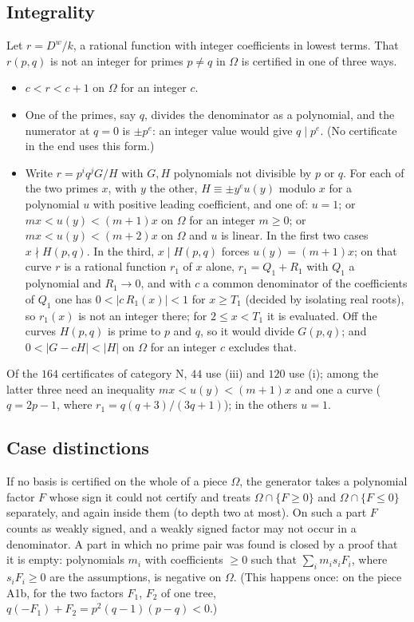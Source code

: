 \documentclass[11pt,a4paper]{amsart}
\theoremstyle{definition}
\theoremstyle{remark}
\newcommand{\Dw}{D^{w}}
\begin{document}
\subsection{Integrality}\label{ss:int} Let $r=\Dw/k$, a rational function with integer coefficients in lowest
terms. That $r(p,q)$ is not an integer for primes $p\ne q$ in $\Omega$ is certified in one of three ways.
\begin{itemize}
\item[(iii)] $c<r<c+1$ on $\Omega$ for an integer $c$.
\item[(ii)] One of the primes, say $q$, divides the denominator as a polynomial, and the numerator at $q=0$ is
$\pm p^e$: an integer value would give $q\mid p^e$. (No certificate in the end uses this form.)
\item[(i)] Write $r=p^iq^jG/H$ with $G,H$ polynomials not divisible by $p$ or $q$. For each of the two primes
$x$, with $y$ the other, $H\equiv\pm y^eu(y)$ modulo $x$ for a polynomial $u$ with positive leading
coefficient, and one of: $u=1$; or $mx<u(y)<(m+1)x$ on $\Omega$ for an integer $m\ge0$; or $mx<u(y)<(m+2)x$ on
$\Omega$ and $u$ is linear. In the first two cases $x\nmid H(p,q)$. In the third, $x\mid H(p,q)$ forces
$u(y)=(m+1)x$; on that curve $r$ is a rational function $r_1$ of $x$ alone, $r_1=Q_1+R_1$ with $Q_1$ a polynomial
and $R_1\to0$, and with $c$ a common denominator of the coefficients of $Q_1$ one has $0<|c\,R_1(x)|<1$ for
$x\ge T_1$ (decided by isolating real roots), so $r_1(x)$ is not an integer there; for $2\le x<T_1$ it is
evaluated. Off the curves $H(p,q)$ is prime to $p$ and $q$, so it would divide $G(p,q)$; and
$0<|G-cH|<|H|$ on $\Omega$ for an integer $c$ excludes that.
\end{itemize}
Of the $164$ certificates of category N, $44$ use (iii) and $120$ use (i); among the latter three need an
inequality $mx<u(y)<(m+1)x$ and one a curve ($q=2p-1$, where $r_1=q(q+3)/(3q+1)$); in the others $u=1$.

\subsection{Case distinctions}\label{ss:split} If no basis is certified on the whole of a piece $\Omega$, the
generator takes a polynomial factor $F$ whose sign it could not certify and treats
$\Omega\cap\{F\ge0\}$ and $\Omega\cap\{F\le0\}$ separately, and again inside them (to depth two at most). On
such a part $F$ counts as weakly signed, and a weakly signed factor may not occur in a denominator. A part in
which no prime pair was found is closed by a proof that it is empty: polynomials $m_i$ with coefficients
$\ge0$ such that $\sum_im_is_iF_i$, where $s_iF_i\ge0$ are the assumptions, is negative on $\Omega$. (This
happens once: on the piece A1b, for the two factors $F_1$, $F_2$ of one tree, $q(-F_1)+F_2=p^2(q-1)(p-q)<0$.)
\end{document}

